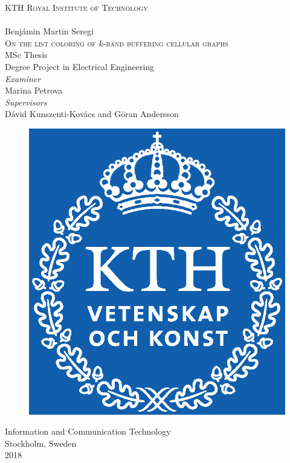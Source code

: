 \documentclass[a4paper, 12pt]{article}
\begin{document}
\thispagestyle{empty}
\begin{center}\renewcommand\baselinestretch{0.9}
{\Large \textsc{KTH Royal Institute of Technology}\\} \hrulefill
\vspace{1.0cm} {\huge \\ Benjámin Martin Seregi \\} \vspace{1cm}
{\Huge\textsc{On the list coloring of $k$-band buffering cellular graphs}\\ \vspace{0.5cm}}
{\large\textsc MSc Thesis \\ Degree Project in Electrical Engineering}\\ \vspace{1cm}
{\large \textit{Examiner}\\
\vspace{0.2cm}
Marina Petrova\vspace{1.2cm}}\\
{\large \textit{Supervisors}\\
\vspace{0.2cm}
Dávid Kunszenti-Kovács and Göran Andersson\vspace{1.2cm}}\\
\begin{figure}[!h]
\begin{center}
\resizebox{5.5cm}{!}
{\includegraphics{KTH_Logotyp_RGB_2013}}
\end{center}
\end{figure}
{\large  Information and Communication Technology \\ \vspace{0.5cm}
Stockholm, Sweden\\2018}
\end{center}
\end{document}
